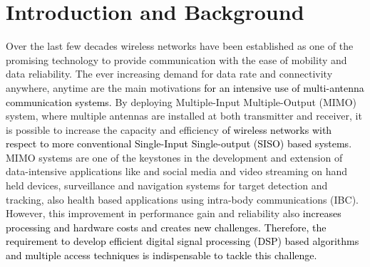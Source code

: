 \chapter{Introduction and Background}
Over the last few decades wireless networks have been established as one of the promising technology to provide communication with the ease of mobility and data reliability. The ever increasing demand for data rate and connectivity anywhere, anytime are the main motivations \textcolor{black}{for an intensive use of multi-antenna communication systems.} By deploying Multiple-Input Multiple-Output (MIMO) system, where multiple antennas are installed at both transmitter and receiver, it is possible to increase the capacity and efficiency \textcolor{black}{of wireless networks with respect to more conventional Single-Input Single-output (SISO) based systems}. MIMO systems are one of the keystones in the development and extension of data-intensive applications like  and social  media and video streaming on hand held devices, surveillance and navigation systems for target detection and tracking, also health based applications using intra-body communications (IBC).\\
However, this improvement in performance gain and reliability also \textcolor{black}{increases processing and hardware costs and creates new challenges. Therefore, the requirement to develop efficient digital signal processing (DSP) based algorithms and multiple access techniques is indispensable to tackle this challenge.}
